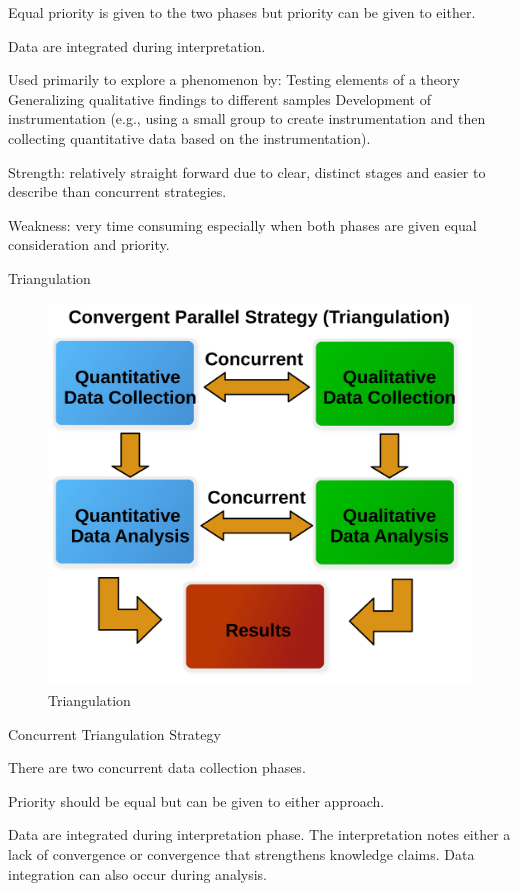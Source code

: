 Equal priority is given to the two phases but priority can be given to either.

Data are integrated during interpretation.

Used primarily to explore a phenomenon by:
	Testing elements of a theory
	Generalizing qualitative findings to different samples
	Development of instrumentation (e.g., using a small group to create instrumentation and then collecting quantitative data based on the instrumentation).

Strength: relatively straight forward due to clear, distinct stages and easier to describe than concurrent strategies.

Weakness: very time consuming especially when both phases are given equal consideration
and priority.

Triangulation

\begin{figure}[H]
	\centering
	\includegraphics[width=\maxwidth{.95\linewidth}]{gfx/14-Triangulation}
	\caption{Triangulation}
	\label{14:fig92}
\end{figure}

Concurrent Triangulation Strategy

There are two concurrent data collection phases.

Priority should be equal but can be given to either approach.

Data are integrated during interpretation phase. The interpretation notes either a lack of convergence or convergence that strengthens knowledge claims. Data integration can also occur during analysis.

